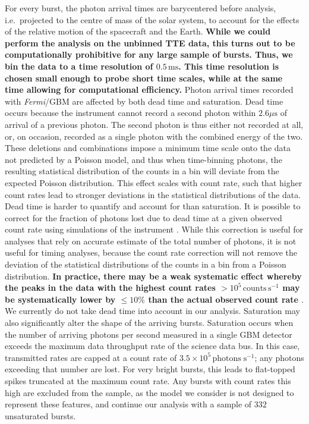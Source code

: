 \documentclass[12pt]{emulateapj}
\newcommand{\project}[1]{\textsl{#1}}
\newcommand{\fermi}{\project{Fermi}}
\begin{document}
For every burst, the photon arrival times 
are barycentered before analysis, i.e.\ projected to the centre of mass of the solar system, to account for the effects of the relative motion of the spacecraft and the Earth.
 {\bf While we could perform the analysis on the unbinned TTE data, this turns out to be computationally prohibitive for any large sample of bursts. Thus, we bin the data to a
 time resolution of $0.5\,\mathrm{ms}$. This time resolution is chosen small enough to probe short time scales, while at the same time allowing for computational efficiency.} 
Photon arrival times recorded with \fermi/GBM are affected by both dead time and saturation. 
Dead time occurs because the instrument cannot record a second photon within $2.6\mu\mathrm{s}$ of arrival of a previous photon. 
The second photon is thus either not recorded at all, or, on occasion, recorded as a single photon with the combined energy of the two. These deletions and combinations 
impose a minimum time scale onto the data not predicted by a Poisson model, and thus when time-binning photons, the resulting statistical distribution of the counts in a bin will
deviate from the expected Poisson distribution. This effect scales with count rate, such that higher count rates lead to stronger deviations in the statistical distributions of the data.
Dead time is harder to quantify and account for than saturation. It is possible to correct for the fraction of photons lost due to dead time at a given observed count rate using simulations of the instrument \citep{meegan2009,briggs2010,chaplin2013}. While this correction is useful for analyses that rely on accurate estimate of the total number of photons, it is not useful for timing analyses, because the count rate correction will not remove the deviation of the statistical distributions of the counts in a bin from a Poisson distribution. {\bf In practice, there may be a weak systematic effect whereby the peaks in the data with the highest count rates $>10^{5} \,\mathrm{counts}\, \mathrm{s}^{-1}$ may be systematically lower by $\leq10\%$ than the actual observed count rate \citep{bhat2014}}. 
We currently do not take dead time into account in our analysis. Saturation may also significantly alter the shape of the arriving bursts. Saturation occurs when the number of arriving photons per second measured in a single GBM detector exceeds the maximum data throughput rate of the science data bus. In this case, transmitted rates are capped at a 
count rate of $3.5 \times 10^{5} \, \mathrm{photons} \; \mathrm{s}^{-1}$; any photons exceeding that number are lost. For very bright bursts, this leads
to flat-topped spikes truncated at the maximum count rate. Any bursts with count rates this high are excluded from the sample, as the model we
consider is not designed to represent these features, and continue our analysis with a sample of $332$ unsaturated bursts.
\end{document}
